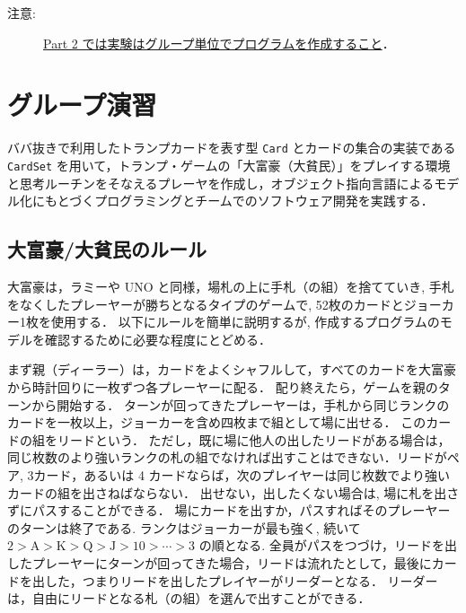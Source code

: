 %
%

\maketitle

\medskip

\begin{description}
\item[注意:] \underline{Part 2 では実験はグループ単位でプログラムを作成すること}．
\end{description}

\medskip

\section{グループ演習}
ババ抜きで利用したトランプカードを表す型 \verb+Card+ とカードの集合の実装である \verb+CardSet+ を用いて，トランプ・ゲームの「大富豪（大貧民）」をプレイする環境と思考ルーチンをそなえるプレーヤを作成し，オブジェクト指向言語によるモデル化にもとづくプログラミングとチームでのソフトウェア開発を実践する．

\subsection*{大富豪/大貧民のルール}
大富豪は，ラミーや UNO と同様，場札の上に手札（の組）を捨てていき, 手札をなくしたプレーヤーが勝ちとなるタイプのゲームで, 52枚のカードとジョーカー1枚を使用する．
以下にルールを簡単に説明するが, 作成するプログラムのモデルを確認するために必要な程度にとどめる．  

まず親（ディーラー）は，カードをよくシャフルして，すべてのカードを大富豪から時計回りに一枚ずつ各プレーヤーに配る．
配り終えたら，ゲームを親のターンから開始する．
ターンが回ってきたプレーヤーは，手札から同じランクのカードを一枚以上，ジョーカーを含め四枚まで組として場に出せる．
このカードの組をリードという．
ただし，既に場に他人の出したリードがある場合は，同じ枚数のより強いランクの札の組でなければ出すことはできない．リードがペア, 3カード，あるいは 4 カードならば，次のプレイヤーは同じ枚数でより強いカードの組を出さねばならない．
出せない，出したくない場合は, 場に札を出さずにパスすることができる．
場にカードを出すか，パスすればそのプレーヤーのターンは終了である. 
ランクはジョーカーが最も強く, 続いて $2 > \mathrm{A} > \mathrm{K} > \mathrm{Q} > \mathrm{J} > 10 > \cdots > 3$ の順となる. 
全員がパスをつづけ，リードを出したプレーヤーにターンが回ってきた場合，リードは流れたとして，最後にカードを出した，つまりリードを出したプレイヤーがリーダーとなる．
リーダーは，自由にリードとなる札（の組）を選んで出すことができる．

